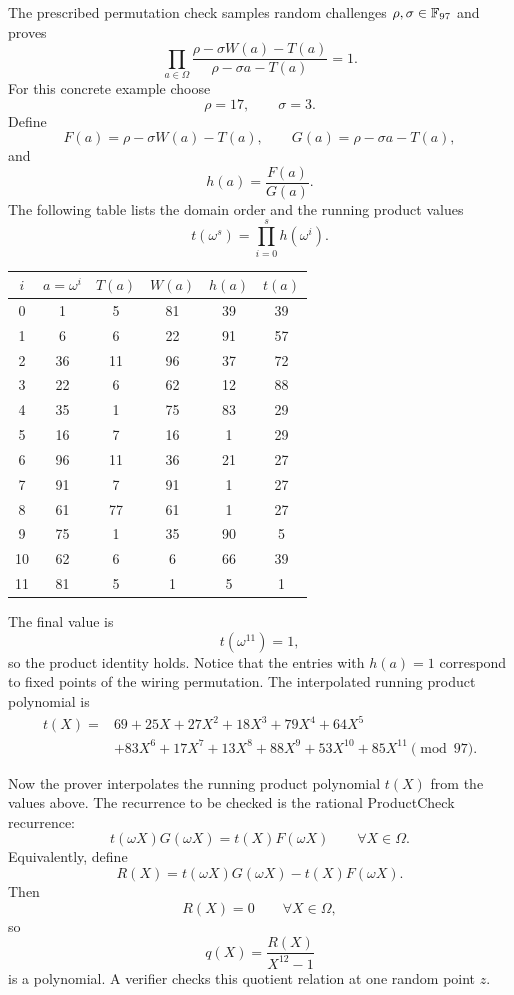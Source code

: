 The prescribed permutation check samples random challenges $\rho,\sigma\in\mathbb{F}_{97}$ and proves
\[
    \prod_{a\in\Omega}
    \frac{\rho-\sigma W(a)-T(a)}{\rho-\sigma a-T(a)}=1.
\]
For this concrete example choose
\[
    \rho=17,
    \qquad
    \sigma=3.
\]
Define
\[
    F(a)=\rho-\sigma W(a)-T(a),
    \qquad
    G(a)=\rho-\sigma a-T(a),
\]
and
\[
    h(a)=\frac{F(a)}{G(a)}.
\]
The following table lists the domain order and the running product values
\[
    t(\omega^s)=\prod_{i=0}^{s}h(\omega^i).
\]

\begin{center}
\small
\begin{tabular}{c|c|c|c|c|c}
\toprule
$i$ & $a=\omega^i$ & $T(a)$ & $W(a)$ & $h(a)$ & $t(a)$\\
\midrule
0 & 1 & 5 & 81 & 39 & 39\\
1 & 6 & 6 & 22 & 91 & 57\\
2 & 36 & 11 & 96 & 37 & 72\\
3 & 22 & 6 & 62 & 12 & 88\\
4 & 35 & 1 & 75 & 83 & 29\\
5 & 16 & 7 & 16 & 1 & 29\\
6 & 96 & 11 & 36 & 21 & 27\\
7 & 91 & 7 & 91 & 1 & 27\\
8 & 61 & 77 & 61 & 1 & 27\\
9 & 75 & 1 & 35 & 90 & 5\\
10 & 62 & 6 & 6 & 66 & 39\\
11 & 81 & 5 & 1 & 5 & 1\\
\bottomrule
\end{tabular}
\end{center}

The final value is
\[
    t(\omega^{11})=1,
\]
so the product identity holds. Notice that the entries with $h(a)=1$ correspond to fixed points of the wiring permutation. The interpolated running product polynomial is
\[
\begin{aligned}
t(X)={}&69+25X+27X^2+18X^3+79X^4+64X^5\\
&+83X^6+17X^7+13X^8+88X^9+53X^{10}+85X^{11}
\pmod{97}.
\end{aligned}
\]

Now the prover interpolates the running product polynomial $t(X)$ from the values above. The recurrence to be checked is the rational ProductCheck recurrence:
\[
    t(\omega X)G(\omega X)=t(X)F(\omega X)
    \qquad\forall X\in\Omega.
\]
Equivalently, define
\[
    R(X)=t(\omega X)G(\omega X)-t(X)F(\omega X).
\]
Then
\[
    R(X)=0\qquad\forall X\in\Omega,
\]
so
\[
    q(X)=\frac{R(X)}{X^{12}-1}
\]
is a polynomial. A verifier checks this quotient relation at one random point $z$.

